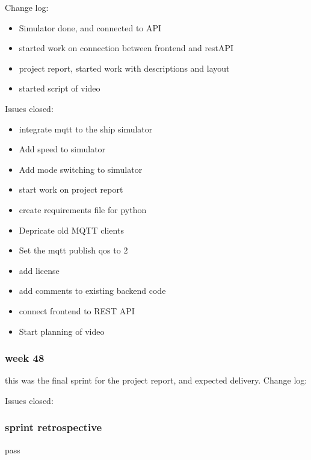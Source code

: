 \documentclass[12pt, a4]{article}
\begin{document}
	Change log:
	\begin{itemize}
		\item Simulator done, and connected to API
		\item started work on connection between frontend and restAPI
		\item project report, started work with descriptions and layout
		\item started script of video
	\end{itemize}

	Issues closed:
	\begin{itemize}
		\item integrate mqtt to the ship simulator
		\item Add speed to simulator
		\item Add mode switching to simulator
		\item start work on project report
		\item create requirements file for python
		\item Depricate old MQTT clients
		\item Set the mqtt publish qos to 2
		\item add license
		\item add comments to existing backend code
		\item connect frontend to REST API
		\item Start planning of video
	\end{itemize}


	\subsubsection{week 48}
	this was the final sprint for the project report, and expected delivery.	
	Change log:
	\begin{itemize}
	\end{itemize}

	Issues closed:
	\begin{itemize}
	\end{itemize}


	\subsubsection{sprint retrospective}
	pass
\end{document}
